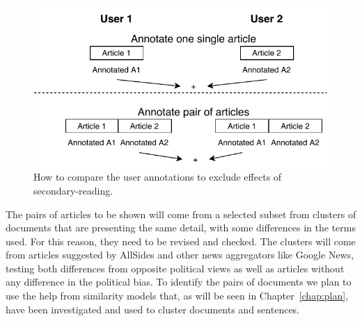 \begin{figure}[!htb]
    \centering
    \includegraphics[width=0.7\linewidth]{figures/diagram-user-study-flow.pdf}
    \caption{How to compare the user annotations to exclude effects of secondary-reading.}
    \label{fig:user_study}
\end{figure}


The pairs of articles to be shown will come from a selected subset from clusters of documents that are presenting the same detail, with some differences in the terms used. For this reason, they need to be revised and checked.
The clusters will come from articles suggested by AllSides and other news aggregators like Google News, testing both differences from opposite political views as well as articles without any difference in the political bias.
To identify the pairs of documents we plan to use the help from similarity models that, as will be seen in Chapter~\ref{chap:plan}, have been investigated and used to cluster documents and sentences.



